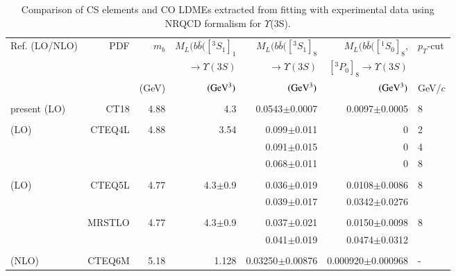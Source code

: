 \documentclass[review]{elsarticle}
\begin{document}
\begin{table}
  \centering
  \caption{Comparison of CS elements and CO LDMEs extracted from fitting with experimental data
    using NRQCD formalism for $\Upsilon$(3S).}
  \footnotesize
  \begin{tabular*}{\textwidth}{@{\extracolsep{\fill}}lrrrrrl@{}}
    \hline
    \hline
    Ref. (LO/NLO) &PDF & $m_b$ & $M_L(b\bar{b}([^3S_1]_1$ & $M_L(b\bar{b}([^3S_1]_8$ & 
    $M_L(b\bar{b}([^1S_0]_8$, & $p_T$-cut \\
    & & & $\rightarrow\Upsilon(3S)$ & $\rightarrow\Upsilon(3S)$ & $[^3P_0]_8\rightarrow\Upsilon(3S)$ & \\
    & & (GeV) & $({\rm GeV^3})$ & $({\rm GeV^3})$ & $({\rm GeV^3})$ & GeV/$c$ \\
    \hline
    \hline
    & & & & & & \\
    present (LO) & CT18 &4.88 &4.3 & 0.0543$\pm$0.0007 & 0.0097$\pm$0.0005 & 8   \\
    & & & & & & \\
    \cite{Domenech:2000ri} (LO) & CTEQ4L & 4.88 & 3.54 & 0.099$\pm$0.011 & 0 & 2 \\
    & & & & 0.091$\pm$0.015 & 0 & 4 \\
    & & & & 0.068$\pm$0.011 & 0 & 8 \\
    & & & & & & \\
    \cite{Brateen:PRD2001} (LO) & CTEQ5L & 4.77 & 4.3$\pm$0.9 & 0.036$\pm$0.019 & 0.0108$\pm$0.0086 & 8 \\
    & & & & 0.039$\pm$0.017 & 0.0342$\pm$0.0276 & \\
    & & & & & & \\
    & MRSTLO & 4.77 & 4.3$\pm$0.9 & 0.037$\pm$0.021 & 0.0150$\pm$0.0098 & 8 \\
    & & & & 0.041$\pm$0.019 & 0.0474$\pm$0.0312 & \\
    & & & & & & \\
    \cite{Gong:2010bk} (NLO) & CTEQ6M & 5.18 & 1.128 & 0.03250$\pm$0.00876 & 0.000920$\pm$0.000968 & -\\

\end{tabular*}
\end{table}
\end{document}
